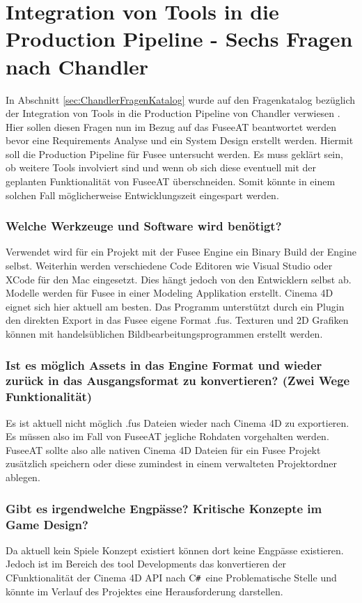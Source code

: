 \documentclass[pagesize, paper=a4, fontsize=12pt, titlepage=true, headings=small, headnosepline, abstractoff, liststotoc, nochapterprefix, plainheadsepline, twoside]{scrreprt}
\newcommand{\CSS}{C\texttt{\# }}
\newcommand{\CPP}{C\nolinebreak\hspace{-.05em}\raisebox{.4ex}{\tiny\bf +}\nolinebreak\hspace{-.10em}\raisebox{.4ex}{\tiny\bf +}}
\begin{document}
\section{Integration von Tools in die Production Pipeline - Sechs Fragen nach Chandler }\label{sec:ChandlerFragenAntwort}
In Abschnitt \ref{sec:ChandlerFragenKatalog} wurde auf den Fragenkatalog bezüglich der Integration von Tools in die Production Pipeline von Chandler verwiesen \parencite[S. 223-224]{Chandler2006}. Hier sollen diesen Fragen nun im Bezug auf das FuseeAT beantwortet werden bevor eine Requirements Analyse und ein System Design erstellt werden. Hiermit soll die Production Pipeline für Fusee untersucht werden. Es muss geklärt sein, ob weitere Tools involviert sind und wenn ob sich diese eventuell mit der geplanten Funktionalität von FuseeAT überschneiden. Somit könnte in einem solchen Fall möglicherweise Entwicklungszeit eingespart werden.

\subsubsection{Welche Werkzeuge und Software wird benötigt?}
Verwendet wird für ein Projekt mit der Fusee Engine ein Binary Build der Engine selbst. Weiterhin werden verschiedene Code Editoren wie Visual Studio oder XCode für den Mac eingesetzt. Dies hängt jedoch von den Entwicklern selbst ab. Modelle werden für Fusee in einer Modeling Applikation erstellt. Cinema 4D eignet sich hier aktuell am besten. Das Programm unterstützt durch ein Plugin den direkten Export in das Fusee eigene Format .fus. Texturen und 2D Grafiken können mit handelsüblichen Bildbearbeitungsprogrammen erstellt werden.

\subsubsection{Ist es möglich Assets in das Engine Format und wieder zurück in das Ausgangsformat zu konvertieren? (Zwei Wege Funktionalität)}
Es ist aktuell nicht möglich .fus Dateien wieder nach Cinema 4D zu exportieren. Es müssen also im Fall von FuseeAT jegliche Rohdaten vorgehalten werden. FuseeAT sollte also alle nativen Cinema 4D Dateien für ein Fusee Projekt zusätzlich speichern oder diese zumindest in einem verwalteten Projektordner ablegen.

\subsubsection{Gibt es irgendwelche Engpässe? Kritische Konzepte im Game Design?}
Da aktuell kein Spiele Konzept existiert können dort keine Engpässe existieren. Jedoch ist im Bereich des tool Developments das konvertieren der \CPP Funktionalität der Cinema 4D API nach \CSS eine Problematische Stelle und könnte im Verlauf des Projektes eine Herausforderung darstellen.
\end{document}
